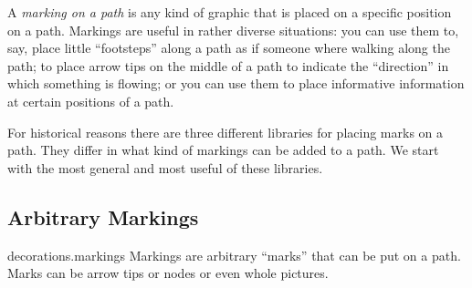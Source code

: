 A \emph{marking on a path} is any kind of graphic that is placed on a
specific position on a path. Markings are useful in rather diverse
situations: you can use them to, say, place little ``footsteps'' along
a path as if someone where walking along the path; to place arrow tips
on the middle of a path to indicate the ``direction'' in which
something is flowing; or you can use them to place informative
information at certain positions of a path.

For historical reasons there are three different libraries for placing
marks on a path. They differ in what kind of markings can be added to
a path. We start with the most general and most useful of these libraries.



\subsection{Arbitrary Markings}

\begin{pgflibrary}{decorations.markings}
  Markings are arbitrary ``marks'' that can be put on a path. Marks
  can be arrow tips or nodes or even whole pictures. 
\end{pgflibrary}

